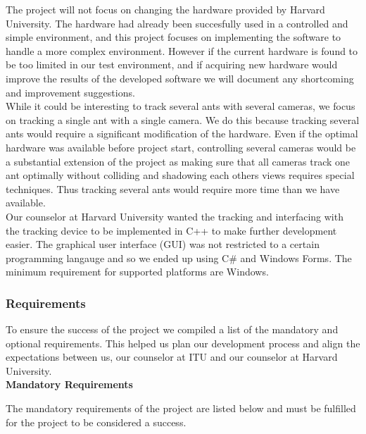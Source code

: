The project will not focus on changing the hardware provided by Harvard University. The hardware had already been succesfully used in a controlled and simple environment, and this project focuses on implementing the software to handle a more complex environment. However if the current hardware is found to be too limited in our test environment, and if acquiring new hardware would improve the results of the developed software we will document any shortcoming and improvement suggestions.\\

While it could be interesting to track several ants with several cameras, we focus on tracking a single ant with a single camera. We do this because tracking several ants would require a significant modification of the hardware. Even if the optimal hardware was available before project start, controlling several cameras would be a substantial extension of the project as making sure that all cameras track one ant optimally without colliding and shadowing each others views requires special techniques. Thus tracking several ants would require more time than we have available. \\

Our counselor at Harvard University wanted the tracking and interfacing with the tracking device to be implemented in C++ to make further development easier. The graphical user interface (GUI) was not restricted to a certain programming langauge and so we ended up using C\# and Windows Forms. The minimum requirement for supported platforms are Windows.

\subsubsection{Requirements} \mbox{}\par
\label{requirements}

To ensure the success of the project we compiled a list of the mandatory and optional requirements. This helped us plan our development process and align the expectations between us, our counselor at ITU and our counselor at Harvard University. \\

\noindent \textbf{Mandatory Requirements} \par
The mandatory requirements of the project are listed below and must be fulfilled for the project to be considered a success.

